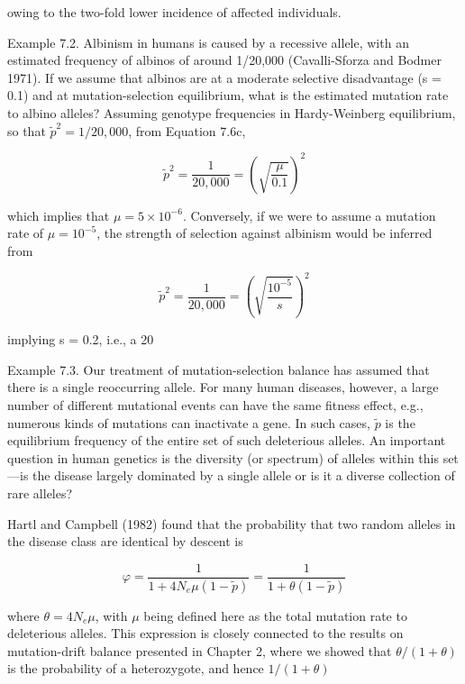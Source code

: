 \documentclass{article}
\begin{document}
owing to the two-fold lower incidence of affected individuals.

Example 7.2. Albinism in humans is caused by a recessive allele, with an estimated frequency of albinos of around 1/20,000 (Cavalli-Sforza and Bodmer 1971). If we assume that albinos are at a moderate selective disadvantage (s = 0.1) and at mutation-selection equilibrium, what is the estimated mutation rate to albino alleles? Assuming genotype frequencies in Hardy-Weinberg equilibrium, so that  $ \tilde{p}^2 = 1/20,000 $, from Equation 7.6c,

\begin{equation}
\widetilde{p}^{2}=\frac{1}{20,000}=\left(\sqrt{\frac{\mu}{0.1}}\right)^{2}
\end{equation}

which implies that  $ \mu = 5 \times 10^{-6} $. Conversely, if we were to assume a mutation rate of  $ \mu = 10^{-5} $, the strength of selection against albinism would be inferred from

\begin{equation}
\widetilde{p}^{2}=\frac{1}{20,000}=\left(\sqrt{\frac{10^{-5}}{s}}\right)^{2}
\end{equation}

implying s = 0.2, i.e., a 20%

Example 7.3. Our treatment of mutation-selection balance has assumed that there is a single reoccurring allele. For many human diseases, however, a large number of different mutational events can have the same fitness effect, e.g., numerous kinds of mutations can inactivate a gene. In such cases,  $ \tilde{p} $ is the equilibrium frequency of the entire set of such deleterious alleles. An important question in human genetics is the diversity (or spectrum) of alleles within this set—is the disease largely dominated by a single allele or is it a diverse collection of rare alleles?

Hartl and Campbell (1982) found that the probability that two random alleles in the disease class are identical by descent is

\begin{equation}
\varphi=\frac{1}{1+4N_{e}\mu(1-\tilde{p})}=\frac{1}{1+\theta(1-\tilde{p})}
\end{equation}

where  $ \theta = 4N_e\mu $, with  $ \mu $ being defined here as the total mutation rate to deleterious alleles. This expression is closely connected to the results on mutation-drift balance presented in Chapter 2, where we showed that  $ \theta/(1 + \theta) $ is the probability of a heterozygote, and hence  $ 1/(1 + \theta) $
\end{document}
